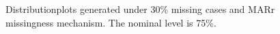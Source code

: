 \documentclass[12pt, fullpage, a4paper]{article}
\begin{document}
\begin{figure}
\begin{center}
{{			}
		}
	\end{center}
	\caption{Distributionplots generated under 30\% missing cases and MARr missingness mechanism. The nominal level is 75\%.}
	\label{fig8}
\end{figure}
\end{document}
